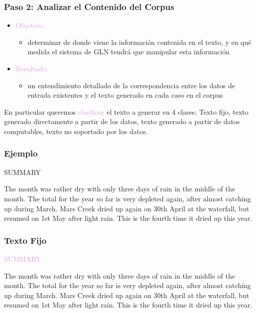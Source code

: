 \documentclass[compress,color=usenames]{beamer}
\newcommand{\mH}[1]{\textcolor{Plum}{#1}}
\begin{document}
\begin{frame}
\frametitle{Paso 2: Analizar el Contenido del Corpus}

\begin{itemize}
\item \mH{Objetivo:}
\begin{itemize}
\item determinar de donde viene la informaci\'on contenida en el texto, y en qu\'e medida el sistema de GLN 
tendr\'a que manipular esta informaci\'on
\end{itemize}
\item \mH{Resultado: }
\begin{itemize}
\item un entendimiento detallado de la correspondencia entre los datos de entrada existentes y el texto generado en cada caso en el corpus
\end{itemize}
\end{itemize}

En particular queremos \mH{clasificar} el texto a generar en 4 clases: Texto fijo, texto generado directamente a partir de los datos, texto generado a partir de datos computables, texto no soportado por los datos.   

\end{frame}

\begin{frame}
\frametitle{Ejemplo}

{SUMMARY}

{ {The month was rather dry with only three days of rain in the middle of the month. The total for the year so far is very depleted again, after almost catching up during March. Mars Creek dried up again on 30th April at the waterfall, but resumed on 1st May after light rain. This is the fourth time it dried up this year.}}

\end{frame}


\begin{frame}
\frametitle{Texto Fijo}

\mH{SUMMARY}

{ {The month was rather dry with only three days of rain in the middle of the month. The total for the year so far is very depleted again, after almost catching up during March. Mars Creek dried up again on 30th April at the waterfall, but resumed on 1st May after light rain. This is the fourth time it dried up this year.}}

\end{frame}
\end{document}
